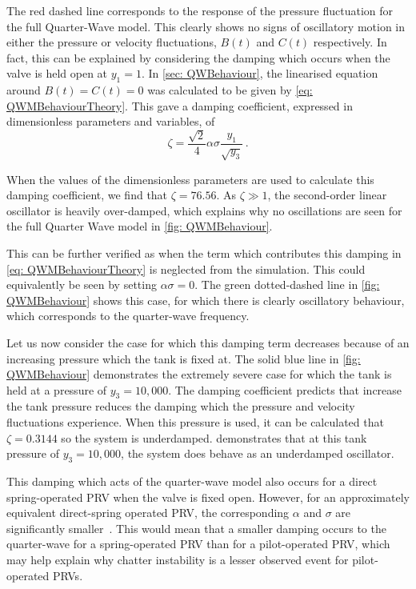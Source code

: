 The red dashed line corresponds to the response of the pressure fluctuation for the full Quarter-Wave model. This clearly shows no signs of oscillatory motion in either the pressure or velocity fluctuations, $B(t)$ and $C(t)$ respectively. In fact, this can be explained by considering the damping which occurs when the valve is held open at $y_1 = 1$. In \cref{sec: QWBehaviour}, the linearised equation around $B(t) = C(t) = 0$ was calculated to be given by \cref{eq: QWMBehaviourTheory}. This gave a damping coefficient, expressed in dimensionless parameters and variables, of
~
\begin{equation*}
    \zeta = \frac{\sqrt{2}}{4} \alpha \sigma \frac{y_1}{\sqrt{y_3}} \, .
\end{equation*}

When the values of the dimensionless parameters are used to calculate this damping coefficient, we find that $\zeta = 76.56$. As $\zeta \gg 1$, the second-order linear oscillator is heavily over-damped, which explains why no oscillations are seen for the full Quarter Wave model in \cref{fig: QWMBehaviour}.

This can be further verified as when the term which contributes this damping in \cref{eq: QWMBehaviourTheory} is neglected from the simulation. This could equivalently be seen by setting $\alpha \sigma = 0$. The green dotted-dashed line in \cref{fig: QWMBehaviour} shows this case, for which there is clearly oscillatory behaviour, which corresponds to the quarter-wave frequency.

Let us now consider the case for which this damping term decreases because of an increasing pressure which the tank is fixed at. The solid blue line in \cref{fig: QWMBehaviour} demonstrates the extremely severe case for which the tank is held at a pressure of $y_3 = 10,000$. The damping coefficient predicts that increase the tank pressure reduces the damping which the pressure and velocity fluctuations experience. When this pressure is used, it can be calculated that $\zeta = 0.3144$ so the system is underdamped.  demonstrates that at this tank pressure of $y_3 = 10,000$, the system does behave as an underdamped oscillator.

This damping which acts of the quarter-wave model also occurs for a direct spring-operated PRV when the valve is fixed open. However, for an approximately equivalent direct-spring operated PRV, the corresponding $\alpha$ and $\sigma$ are significantly smaller~\cite{Hos2015DynamicModelling}. This would mean that a smaller damping occurs to the quarter-wave for a spring-operated PRV than for a pilot-operated PRV, which may help explain why chatter instability is a lesser observed event for pilot-operated PRVs.

